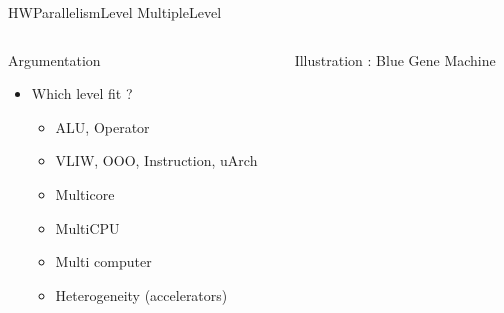 %
\begin{Frame}{HWParallelismLevel MultipleLevel}

  \begin{columns}[t]
    \begin{column}{4cm} %
      \begin{block}{Argumentation}
        \begin{itemize}
        \item Which level fit ?
          \begin{itemize}
          \item ALU, Operator
          \item VLIW, OOO, Instruction, uArch
          \item Multicore
          \item MultiCPU
          \item Multi computer
          \item Heterogeneity (accelerators)
          \end{itemize}
        \end{itemize}
      \end{block} 
    \end{column}
    \begin{column}{10cm} %
      \begin{block}{Illustration : Blue Gene Machine}
      \end{block}   
    \end{column}
  \end{columns}  
\end{Frame}


